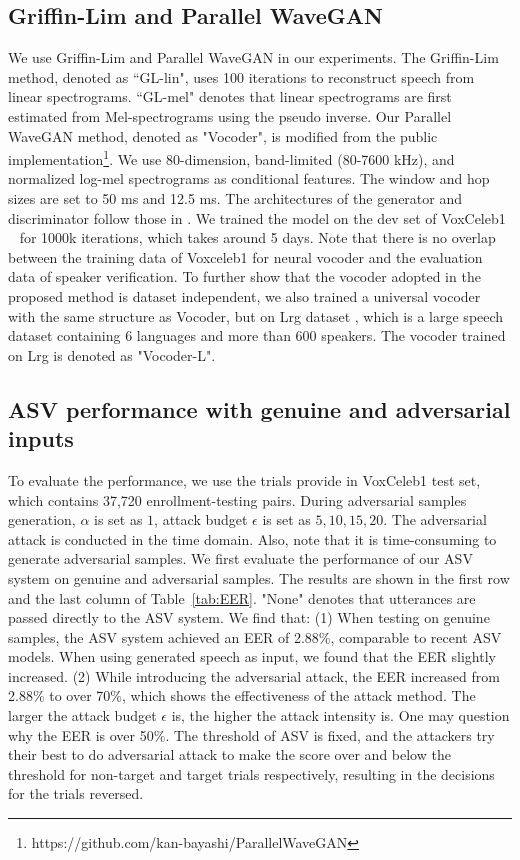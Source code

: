 \subsection{Griffin-Lim and Parallel WaveGAN}
We use Griffin-Lim and Parallel WaveGAN in our experiments. The Griffin-Lim method, denoted as ``GL-lin", uses 100 iterations to reconstruct speech from linear spectrograms. ``GL-mel" denotes that linear spectrograms are first estimated from Mel-spectrograms using the pseudo inverse. Our Parallel WaveGAN method, denoted as "Vocoder", is modified from the public implementation\footnote[4]{https://github.com/kan-bayashi/ParallelWaveGAN}.
We use 80-dimension, band-limited (80-7600 kHz), and normalized log-mel spectrograms as conditional features. The window and hop sizes are set to 50 ms and 12.5 ms.
The architectures of the generator and discriminator follow those in \cite{yamamoto2020parallel}. We trained the model on the dev set of VoxCeleb1 ~\cite{nagrani2017voxceleb} for 1000k iterations, which takes around 5 days. 
Note that there is no overlap between the training data of Voxceleb1 for neural vocoder and the evaluation data of speaker verification.
To further show that the vocoder adopted in the proposed method is dataset independent, we also trained a universal vocoder~\cite{hsu2019towards} with the same structure as Vocoder, but on Lrg dataset \cite{hsu2019towards}, which is a large speech dataset containing 6 languages and more than 600 speakers.
The vocoder trained on Lrg is denoted as "Vocoder-L".

\subsection{ASV performance with genuine and adversarial inputs}
\label{subsec:ASV performance}
To evaluate the performance, we use the trials provide in VoxCeleb1 test set, which contains 37,720 enrollment-testing pairs.
During adversarial samples generation, $\alpha$ is set as $1$, attack budget $\epsilon$ is set as $5,10,15,20$. 
The adversarial attack is conducted in the time domain.
Also, note that it is time-consuming to generate adversarial samples.
We first evaluate the performance of our ASV system on genuine and adversarial samples.
The results are shown in the first row and the last column of Table~\ref{tab:EER}. "None" denotes that utterances are passed directly to the ASV system. 
We find that: 
(1) When testing on genuine samples, the ASV system achieved an EER of 2.88\%, comparable to recent ASV models.
When using generated speech as input, we found that the EER slightly increased.
(2) While introducing the adversarial attack, the EER increased from 2.88\% to over 70\%, which shows the effectiveness of the attack method.
The larger the attack budget $\epsilon$ is, the higher the attack intensity is.
One may question why the EER is over 50\%. The threshold of ASV is fixed, and the attackers try their best to do adversarial attack to make the score over and below the threshold for non-target and target trials respectively, resulting in the decisions for the trials reversed.
